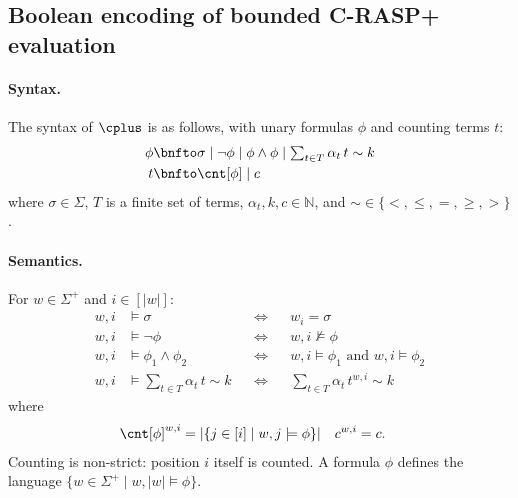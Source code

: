 
\subsection{Boolean encoding of bounded C-RASP+ evaluation}

\paragraph{Syntax.}
The syntax of $\cplus$ is as follows, with unary formulas $\phi$ and counting terms $t$:
\begin{align*}
  \phi & \bnfto \sigma \mid \lnot \phi \mid \phi \land \phi \mid \textstyle\sum_{t\in T} \alpha_t\, t \sim k \\
  t    & \bnfto \cnt[\phi] \mid c
\end{align*}
where $\sigma\in\Sigma$, $T$ is a finite set of terms, $\alpha_t, k, c \in \mathbb{N}$, and
${\sim}\in\{<,\leq,=,\geq,>\}$.

\paragraph{Semantics.}
For $w\in\Sigma^+$ and $i\in[|w|]$:
\begin{align*}
  w,i &\models \sigma &&\iff && w_i=\sigma\\
  w,i &\models \lnot\phi &&\iff && w,i\not\models\phi\\
  w,i &\models \phi_1\land\phi_2 &&\iff && w,i\models\phi_1 \text{ and } w,i\models\phi_2\\
  w,i &\models \textstyle\sum_{t\in T}\alpha_t\, t\sim k &&\iff && \textstyle\sum_{t\in T}\alpha_t\, t^{w,i}\sim k
\end{align*}
where
\begin{align*}
  \cnt[\phi]^{w,i} &= |\{j\in[i] \mid w,j\models\phi\}| &
  c^{w,i} &= c.
\end{align*}
Counting is non-strict: position $i$ itself is counted. A formula $\phi$ defines the language
$\{w\in\Sigma^+ \mid w,|w|\models\phi\}$.

